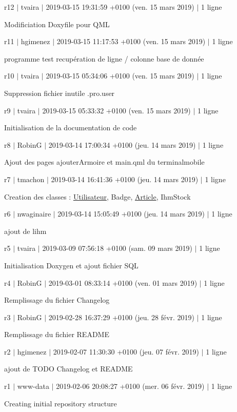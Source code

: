 r12 $\vert$ tvaira $\vert$ 2019-\/03-\/15 19\+:31\+:59 +0100 (ven. 15 mars 2019) $\vert$ 1 ligne

Modificiation Doxyfile pour Q\+ML

r11 $\vert$ hgimenez $\vert$ 2019-\/03-\/15 11\+:17\+:53 +0100 (ven. 15 mars 2019) $\vert$ 1 ligne

programme test recupération de ligne / colonne base de donnée

r10 $\vert$ tvaira $\vert$ 2019-\/03-\/15 05\+:34\+:06 +0100 (ven. 15 mars 2019) $\vert$ 1 ligne

Suppression fichier inutile .pro.\+user

r9 $\vert$ tvaira $\vert$ 2019-\/03-\/15 05\+:33\+:32 +0100 (ven. 15 mars 2019) $\vert$ 1 ligne

Initialisation de la documentation de code

r8 $\vert$ RobinG $\vert$ 2019-\/03-\/14 17\+:00\+:34 +0100 (jeu. 14 mars 2019) $\vert$ 1 ligne

Ajout des pages ajouter\+Armoire et main.\+qml du terminalmobile

r7 $\vert$ tmachon $\vert$ 2019-\/03-\/14 16\+:41\+:36 +0100 (jeu. 14 mars 2019) $\vert$ 1 ligne

Creation des classes \+: \hyperlink{class_utilisateur}{Utilisateur}, Badge, \hyperlink{class_article}{Article}, Ihm\+Stock

r6 $\vert$ nwaginaire $\vert$ 2019-\/03-\/14 15\+:05\+:49 +0100 (jeu. 14 mars 2019) $\vert$ 1 ligne

ajout de l\textquotesingle{}ihm

r5 $\vert$ tvaira $\vert$ 2019-\/03-\/09 07\+:56\+:18 +0100 (sam. 09 mars 2019) $\vert$ 1 ligne

Initialisation Doxygen et ajout fichier S\+QL

r4 $\vert$ RobinG $\vert$ 2019-\/03-\/01 08\+:33\+:14 +0100 (ven. 01 mars 2019) $\vert$ 1 ligne

Remplissage du fichier Changelog

r3 $\vert$ RobinG $\vert$ 2019-\/02-\/28 16\+:37\+:29 +0100 (jeu. 28 févr. 2019) $\vert$ 1 ligne

Remplissage du fichier R\+E\+A\+D\+ME

r2 $\vert$ hgimenez $\vert$ 2019-\/02-\/07 11\+:30\+:30 +0100 (jeu. 07 févr. 2019) $\vert$ 1 ligne

ajout de T\+O\+DO Changelog et R\+E\+A\+D\+ME

r1 $\vert$ www-\/data $\vert$ 2019-\/02-\/06 20\+:08\+:27 +0100 (mer. 06 févr. 2019) $\vert$ 1 ligne

Creating initial repository structure 